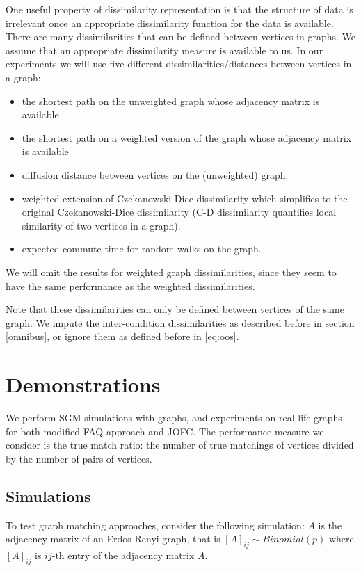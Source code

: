 \documentclass[12pt,oneside,final]{thesis}\usepackage[]{graphicx}\usepackage[]{color}
\begin{document}
One useful property of dissimilarity representation is that the structure of data is irrelevant once an appropriate dissimilarity function  for the data is available. 
There are many dissimilarities that can be defined between vertices in graphs. We assume that an appropriate dissimilarity measure is available to us.
In our experiments we will use five different dissimilarities/distances between vertices in a graph:
\begin{itemize}
 \item the shortest path on the  unweighted graph whose adjacency matrix is available
 \item the shortest path on a weighted version of the graph whose adjacency matrix is available
 \item diffusion distance between vertices on the (unweighted) graph.
 \item weighted extension of Czekanowski-Dice dissimilarity\cite{DICE,weightedDICE} which simplifies to the original Czekanowski-Dice dissimilarity (C-D dissimilarity  quantifies local similarity of two vertices in a graph).
 \item expected commute time for random walks on the graph.
 \end{itemize}
 We will omit the results for weighted graph dissimilarities, since they seem to have the same performance as the weighted dissimilarities.
 
 Note that these dissimilarities can only be defined between vertices of the same graph. We impute the inter-condition dissimilarities   as described before in section \ref{omnibus}, or ignore them as defined before in \ref{eq:oos}.
 
\section{Demonstrations}

We perform SGM simulations with graphs, and experiments on real-life graphs for  both modified FAQ approach and JOFC. The performance measure we consider is the true match ratio: the number of true matchings of vertices  divided by the number of pairs of vertices.

\subsection{Simulations}
  To test graph matching approaches, consider the following simulation: $A$ is the adjacency matrix of an Erdos-Renyi graph, that is
  $\left[A\right]_{ij} \sim Binomial(p)$ where $\left[A\right]_{ij}$ is $ij$-th entry of the adjacency matrix  $A$.
 
\end{document}
